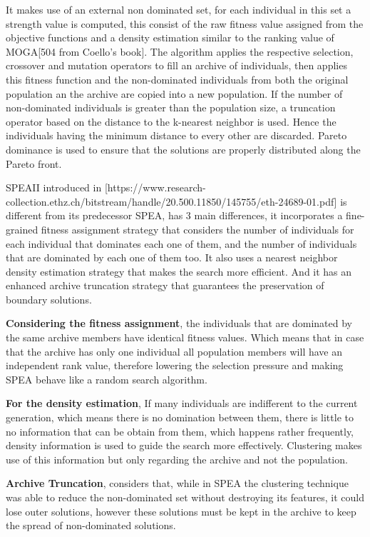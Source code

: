 It makes use of an external non dominated set, for each individual in this set a strength value is computed, this consist of the raw fitness value assigned from the objective functions and a density estimation similar to the ranking value of MOGA[504 from Coello's book]. The algorithm applies the respective selection, crossover and mutation operators to fill an archive of individuals, then applies this fitness function and the non-dominated individuals from both the original population an the archive are copied into a new population. If the number of non-dominated individuals is greater than the population size, a truncation operator based on the distance to the k-nearest neighbor is used. Hence the individuals having the minimum distance to every other are discarded. Pareto dominance is used to ensure that the solutions are properly distributed along the Pareto front.

SPEAII introduced in [https://www.research-collection.ethz.ch/bitstream/handle/20.500.11850/145755/eth-24689-01.pdf] is different from its predecessor SPEA, has 3 main differences, it incorporates a fine-grained fitness assignment strategy that considers the number of individuals for each individual that dominates each one of them, and the number of individuals that are dominated by each one of them too. It also uses a nearest neighbor density estimation strategy that makes the search more efficient. And it has an enhanced archive truncation strategy that guarantees the preservation of boundary solutions.

\textbf{Considering the fitness assignment}, the individuals that are dominated by the same archive members have identical fitness values. Which means that in case that the archive has only one individual all population members will have an independent rank value, therefore lowering the selection pressure and making SPEA behave like a random search algorithm.

\textbf{For the density estimation}, If many individuals are indifferent to the current generation, which means there is no domination between them, there is little to no information that can be obtain from them, which happens rather frequently, density information is used to guide the search more effectively. Clustering makes use of this information but only regarding the archive and not the population.

\textbf{Archive Truncation}, considers that, while in SPEA the clustering technique was able to reduce the non-dominated set without destroying its features, it could lose outer solutions, however these solutions must be kept in the archive to keep the spread of non-dominated solutions.

